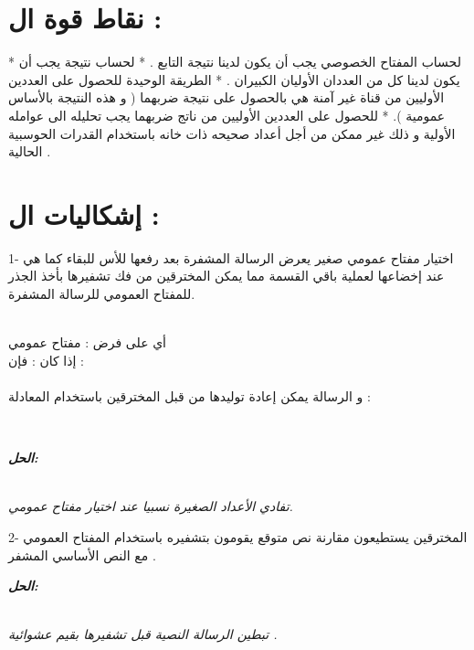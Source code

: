 \documentclass[11pt,a4paper]{report}
\begin{document}
\begin{otherlanguage}{arabic}
\chapter{نقاط قوة ال  :}
\begin{otherlanguage}{arabic}
\begin{center}
* لحساب المفتاح الخصوصي يجب أن يكون لدينا نتيجة التابع \textLR{\phi} .
\newline
* لحساب نتيجة \textLR{\phi} يجب أن يكون لدينا كل من العددان الأوليان الكبيران  .
\newline
* الطريقة الوحيدة للحصول على العددين الأوليين من قناة غير آمنة هي بالحصول على نتيجة ضربهما 
( و هذه النتيجة بالأساس عمومية ).
\newline
* للحصول على العددين الأوليين من ناتج ضربهما يجب تحليله الى عوامله الأولية و ذلك غير ممكن من أجل أعداد صحيحه ذات  خانه باستخدام القدرات الحوسبية الحالية .
\end{center}
\end{otherlanguage}
\chapter{إشكاليات ال  :}
\begin{otherlanguage}{arabic}
\begin{center}
\begin{flushleft}
1- اختيار مفتاح عمومي صغير   يعرض الرسالة المشفرة  بعد رفعها للأس   للبقاء كما هي عند إخضاعها لعملية باقي القسمة مما يمكن المخترقين من فك تشفيرها بأخذ الجذر للمفتاح العمومي للرسالة المشفرة.
\end{flushleft}
\\
أي على فرض :  مفتاح عمومي
\\
 إذا كان : 
\newline
فإن :
\\
\\
و الرسالة يمكن إعادة توليدها من قبل المخترقين باستخدام المعادلة :

\\

\begin{flushleft}
\textit{\textbf{الحل:}}
\end{flushleft}
\\
\textit{تفادي الأعداد الصغيرة نسبيا عند اختيار مفتاح عمومي.}
\\
\begin{flushleft}
2- المخترقين يستطيعون مقارنة نص متوقع يقومون بتشفيره باستخدام المفتاح العمومي مع النص الأساسي المشفر .
\end{flushleft}
\newline
\begin{flushleft}
\textit{\textbf{الحل:}}
\end{flushleft}
\\
\textit{تبطين الرسالة النصية قبل تشفيرها بقيم عشوائية .}
\end{center}
\end{otherlanguage}

\end{otherlanguage}
\end{document}
